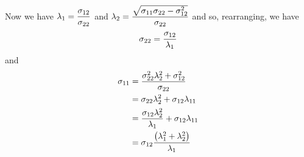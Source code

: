 Now we have $\lambda_{1}=\dfrac{ \sigma _{12}}{ \sigma _{22}}$ and
$\lambda_{2}=\dfrac{\sqrt{ \sigma _{11} \sigma _{22}- \sigma _{12}^{2}}}{ \sigma _{22}}$
and so, rearranging, we have
\begin{equation}
   \sigma _{22}=\dfrac{ \sigma _{12}}{\lambda_{1}}
\end{equation}
and
\begin{equation}
  \begin{aligned}
     \sigma _{11}&=\dfrac{ \sigma _{22}^{2}\lambda_{2}^{2}+
       \sigma _{12}^{2}}{ \sigma _{22}}\\
    &= \sigma _{22}\lambda_{2}^{2}+ \sigma _{12}\lambda_{11}\\
    &=\dfrac{ \sigma _{12}\lambda_{2}^{2}}{\lambda_{1}}+ \sigma _{12}\lambda_{11}\\
    &= \sigma _{12}\dfrac{\left( \lambda_{1}^{2}+\lambda_{2}^{2} \right)}{\lambda_{1}}
  \end{aligned}
\end{equation}

